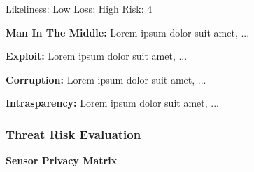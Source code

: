 Likeliness: Low
Loss: High
Risk: 4




\textbf{Man In The Middle:}
Lorem ipsum dolor suit amet, ...

\textbf{Exploit:}
Lorem ipsum dolor suit amet, ...

\textbf{Corruption:}
Lorem ipsum dolor suit amet, ...

\textbf{Intrasparency:}
Lorem ipsum dolor suit amet, ...






\subsubsection{Threat Risk Evaluation}


\textbf{Sensor Privacy Matrix}

%


